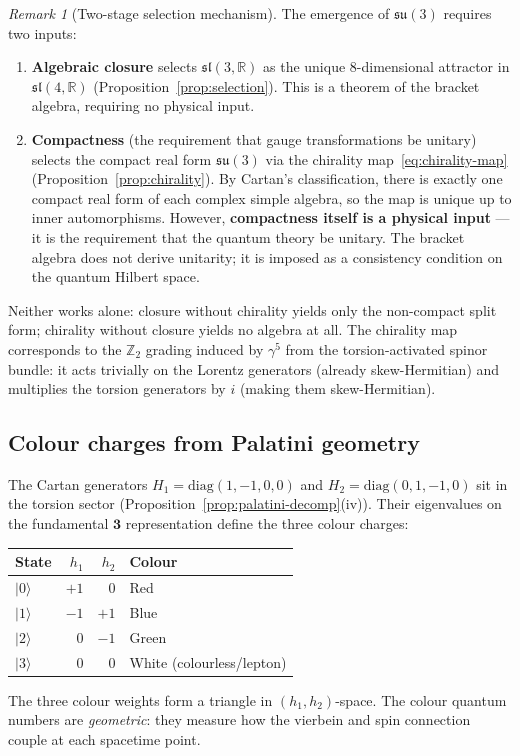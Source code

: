 \documentclass[11pt,a4paper]{article}
\theoremstyle{plain}
\theoremstyle{definition}
\theoremstyle{remark}
\newtheorem{remark}[theorem]{Remark}
\begin{document}
\begin{remark}[Two-stage selection mechanism]\label{rem:two-stage}
The emergence of $\mathfrak{su}(3)$ requires two inputs:
\begin{enumerate}[label=(\arabic*),noitemsep]
  \item \textbf{Algebraic closure} selects $\mathfrak{sl}(3,\mathbb{R})$ as the
    unique 8-dimensional attractor in $\mathfrak{sl}(4,\mathbb{R})$
    (Proposition~\ref{prop:selection}).  This is a theorem of the
    bracket algebra, requiring no physical input.
  \item \textbf{Compactness} (the requirement that gauge transformations
    be unitary) selects the compact real form $\mathfrak{su}(3)$
    via the chirality map~\eqref{eq:chirality-map}
    (Proposition~\ref{prop:chirality}).  By Cartan's classification,
    there is exactly one compact real form of each complex simple
    algebra, so the map is unique up to inner automorphisms.
    However, \textbf{compactness itself is a physical input} ---
    it is the requirement that the quantum theory be unitary.
    The bracket algebra does not derive unitarity; it is imposed as
    a consistency condition on the quantum Hilbert space.
\end{enumerate}
Neither works alone: closure without chirality yields only the non-compact
split form; chirality without closure yields no algebra at all.
The chirality map corresponds to the $\mathbb{Z}_2$ grading induced by
$\gamma^5$ from the torsion-activated spinor bundle: it acts trivially on the
Lorentz generators (already skew-Hermitian) and multiplies the torsion generators
by $i$ (making them skew-Hermitian).
\end{remark}

\subsection{Colour charges from Palatini geometry}

The Cartan generators $H_1 = \mathrm{diag}(1,-1,0,0)$ and
$H_2 = \mathrm{diag}(0,1,-1,0)$ sit in the torsion sector
(Proposition~\ref{prop:palatini-decomp}(iv)).
Their eigenvalues on the fundamental $\mathbf{3}$ representation
define the three colour charges:
\begin{center}
\begin{tabular}{lrrl}
\toprule
State & $h_1$ & $h_2$ & Colour \\
\midrule
$|0\rangle$ & $+1$ & $0$ & Red \\
$|1\rangle$ & $-1$ & $+1$ & Blue \\
$|2\rangle$ & $0$ & $-1$ & Green \\
$|3\rangle$ & $0$ & $0$ & White (colourless/lepton) \\
\bottomrule
\end{tabular}
\end{center}
The three colour weights form a triangle in $(h_1, h_2)$-space.
The colour quantum numbers are \emph{geometric}: they measure
how the vierbein and spin connection couple at each spacetime point.
\end{document}
